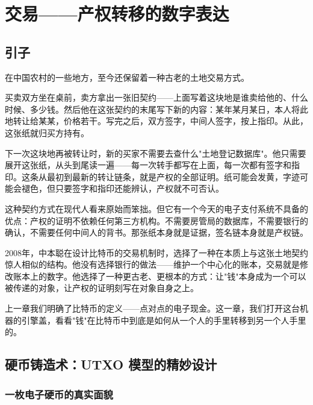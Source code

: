\documentclass[a4paper,12pt,openany]{ctexbook}
\begin{document}
\chapter{交易——产权转移的数字表达}



\section*{引子}


在中国农村的一些地方，至今还保留着一种古老的土地交易方式。

买卖双方坐在桌前，卖方拿出一张旧契约——上面写着这块地是谁卖给他的、什么时候、多少钱。然后他在这张契约的末尾写下新的内容：某年某月某日，本人将此地转让给某某，价格若干。写完之后，双方签字，中间人签字，按上指印。从此，这张纸就归买方持有。

下一次这块地再被转让时，新的买家不需要去查什么"土地登记数据库"。他只需要展开这张纸，从头到尾读一遍——每一次转手都写在上面，每一次都有签字和指印。这条从最初到最新的转让链条，就是产权的全部证明。纸可能会发黄，字迹可能会褪色，但只要签字和指印还能辨认，产权就不可否认。

这种契约方式在现代人看来原始而笨拙。但它有一个今天的电子支付系统不具备的优点：产权的证明不依赖任何第三方机构。不需要房管局的数据库，不需要银行的确认，不需要任何中间人的背书。那张纸本身就是证据，签名链本身就是产权链。

2008年，中本聪在设计比特币的交易机制时，选择了一种在本质上与这张土地契约惊人相似的结构。他没有选择银行的做法——维护一个中心化的账本，交易就是修改账本上的数字。他选择了一种更古老、更根本的方式：让"钱"本身成为一个可以被传递的对象，让产权的证明刻写在对象自身之上。

上一章我们明确了比特币的定义——点对点的电子现金。这一章，我们打开这台机器的引擎盖，看看"钱"在比特币中到底是如何从一个人的手里转移到另一个人手里的。


\section*{硬币铸造术：UTXO 模型的精妙设计}



\subsection*{一枚电子硬币的真实面貌}
\end{document}
